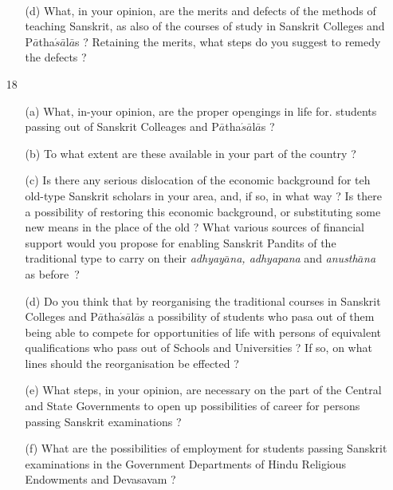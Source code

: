 \newpage
{\rm 
\begin{itemize} 
\item[~]\begin{itemize}
\item[(d)] What, in your opinion, are the merits and defects of the methods of teaching Sanskrit, as also of the courses of study in Sanskrit Colleges and P$\bar{a}$tha$\acute{s}\bar{a}$l$\bar{a}$s ? Retaining the merits, what steps do you suggest to remedy the defects ?
                \end{itemize}  
     
   \item[18] \begin{itemize}
   
              \item[(a)] What, in-your opinion, are the proper opengings in life for. students passing out of Sanskrit Colleages and P$\bar{a}$tha$\acute{s}\bar{a}$l$\bar{a}$s ?
              
              \item[(b)] To what extent are these available in your part of the country ?
              
              \item[(c)] Is there any serious dislocation of the economic background for teh old-type Sanskrit scholars in your area, and, if so, in what way ? Is there a possibility of restoring this economic background, or substituting some new means in the place of the old ? What various sources of financial support would you propose for enabling Sanskrit Pandits of the traditional type to carry on their {\textit {adhyay$\bar{a}$na, adhyapana}} and {\textit {anusth$\bar{a}$na}} as before~? 
              
              \item[(d)] Do you think that by reorganising the traditional courses in Sanskrit Colleges and P$\bar{a}$tha$\acute{s}\bar{a}$l$\bar{a}$s a possibility of students who pasa out of them being able to compete for opportunities of life with persons of equivalent qualifications who pass out of Schools and Universities ? If so, on what lines should the reorganisation be effected ?
              
              \item[(e)] What steps, in your opinion, are necessary on the part of the Central and State Governments to open up possibilities of career for persons passing Sanskrit examinations ?
              
              \item[(f)] What are the possibilities of employment for students passing Sanskrit examinations in the Government Departments of Hindu Religious Endowments and Devasavam ?
              \end{itemize}             
  

\end{itemize}}
